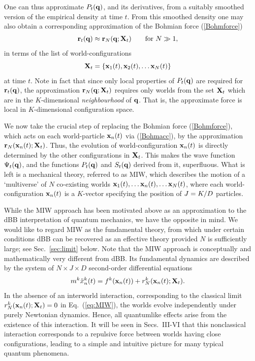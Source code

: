 \documentclass[twocolumn,aps,pra,amsmath,amssymb,superscriptaddress]{revtex4}
\newcommand{\beq}{\begin{equation}}
\newcommand{\eeq}{\end{equation}}
\newcommand{\cu}[1]{\left\{ {#1} \right\}}
\renewcommand{\(}{\left(}
\renewcommand{\)}{\right)}
\newcommand{\blk}{\color{black}}
\begin{document}
One can thus approximate \blk  $P_t({\bf q})$, and its derivatives, from 
a suitably smoothed version of the empirical density at time $t$. From this   smoothed density \blk one   may \blk also 
obtain a corresponding approximation of the Bohmian force (\ref{Bohmforce}) 
\begin{align}
{\bf r}_t({\bf q})  \approx {\bf r}_N({\bf q};{\bf X}_t) \blk \qquad \text{for }N\gg 1 ,
  \label{eq:quantum-force}
\end{align}
  in terms of the list of world-configurations \blk
\beq
{\bf X}_t=\cu{{\bf x}_1(t), {\bf x}_2(t), \ldots {\bf x}_N(t) } 
\eeq
at time $t$.  Note in fact that since only local properties of $P_t({\bf q})$ are required 
for ${\bf r}_t({\bf q})$, the approximation ${\bf r}_N({\bf q};{\bf X}_t)$ requires 
only worlds from the set ${\bf X}_t$ which are in the $K$-dimensional {\em neighbourhood} 
of ${\bf q}$. That is, the approximate force is local in $K$-dimensional
configuration space. 

\blk We now take the crucial step of
replacing the Bohmian force \blk (\ref{Bohmforce}), which acts on each
world-particle ${\bf x}_n(t)$ via (\ref{Bohmacc}), by the approximation ${\bf
r}_N({\bf x}_n(t);{\bf X}_t)$. Thus, the evolution of world-configuration ${\bf
x}_n(t)$ is directly determined by the other configurations in ${\bf X}_t$.
This makes the wave function $\Psi_t({\bf q})$, and the functions $P_t({\bf
q})$ and $S_t({\bf q})$ derived from it, superfluous. \blk
What is left is a mechanical theory, referred to as MIW, which describes the
motion of a `multiverse' of ${N}$ co-existing worlds ${\bf x}_1(t), \ldots {\bf
x}_n(t), \ldots {\bf x}_N(t)$, where each world-configuration ${\bf x}_n(t)$ is
a $K$-vector specifying the position of $\blk J\blk=K/D$ particles. 


\blk While the MIW approach has been motivated above as an approximation to the
dBB interpretation of quantum mechanics, we have the opposite in mind. We would
like to regard MIW as the fundamental theory, from which under certain
conditions dBB can be recovered as an effective theory provided $N$ is sufficiently
large; see Sec.~\ref{sec:limit} below. \blk
Note that \blk the MIW
approach is conceptually and mathematically very different from dBB.  Its
fundamental dynamics \blk are described by the system of $N\times J \times D$
second-order differential equations 
\beq \label{eq:MIW}
m^k\ddot{x}_n^k(t) = f^k({\bf x}_n(t)) + r^k_N({\bf x}_n(t);{\bf X}_t).
\eeq
In
the absence of an interworld interaction, corresponding to the classical limit
$r^k_N({\bf x}_n(t);{\bf X}_t)=0$ in  Eq.~(\ref{eq:MIW}), the worlds evolve
independently under purely Newtonian dynamics. Hence, all quantumlike effects
arise from the existence of this interaction. It will be seen in Secs.~III-VI
that this nonclassical interaction corresponds to a repulsive force between
worlds having close \blk configurations, leading to a simple and intuitive
picture for many typical quantum phenomena.
\end{document}
